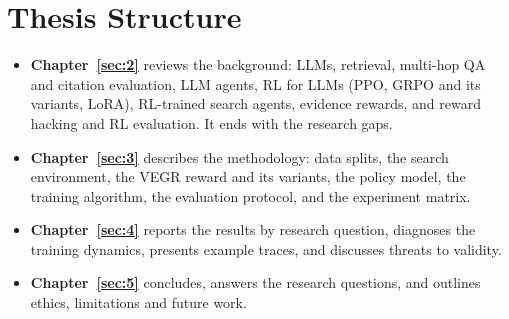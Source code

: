 \section{Thesis Structure}\label{sec:1.6}

\begin{itemize}
\tightlist
\item
  \textbf{Chapter~\ref{sec:2}} reviews the background: LLMs, retrieval,
  multi-hop QA and citation evaluation, LLM agents, RL for LLMs (PPO,
  GRPO and its variants, LoRA), RL-trained search agents, evidence
  rewards, and reward hacking and RL evaluation. It ends with the
  research gaps.
\item
  \textbf{Chapter~\ref{sec:3}} describes the methodology: data splits,
  the search environment, the VEGR reward and its variants, the policy
  model, the training algorithm, the evaluation protocol, and the
  experiment matrix.
\item
  \textbf{Chapter~\ref{sec:4}} reports the results by research question,
  diagnoses the training dynamics, presents example traces, and
  discusses threats to validity.
\item
  \textbf{Chapter~\ref{sec:5}} concludes, answers the research
  questions, and outlines ethics, limitations and future work.
\end{itemize}
